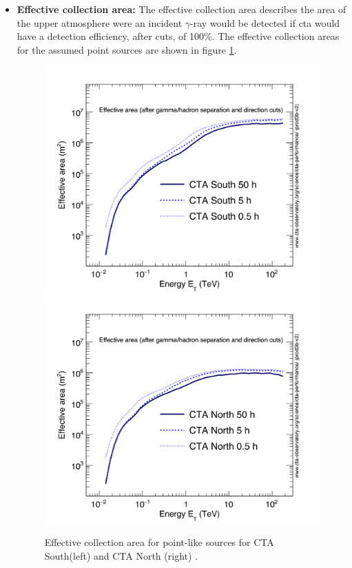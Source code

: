 \documentclass[main.tex]{subfiles}
\begin{document}
\begin{itemize}
\item \textbf{Effective collection area:} The effective collection area describes the area of the upper atmosphere were an incident $\gamma$-ray would be detected if \gls{cta} would have a detection efficiency, after cuts, of 100\%. The effective collection areas for the assumed point sources are shown in figure \ref{fig:effarea}.

  \begin{figure}[!htb]
    \includegraphics[width=\linewidth]{Pictures/CTA-Performance-prod3b-v2-South-20deg-EffectiveArea.pdf}
    \endminipage\hfill
    \includegraphics[width=\linewidth]{Pictures/CTA-Performance-prod3b-v2-North-20deg-EffectiveArea.pdf}
    \endminipage\hfill
    \caption{\label{fig:effarea}Effective collection area for point-like sources for CTA South(left) and CTA North (right) \cite{CTAPerformance}.}
  \end{figure}


\end{itemize}
\end{document}
